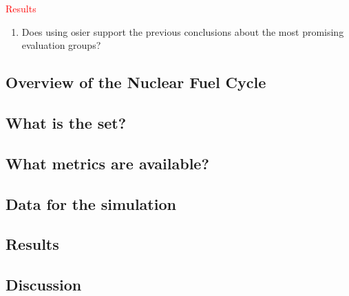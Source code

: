 \textcolor{red}{Results}
\begin{enumerate}
    \item Does using \ac{osier} support the previous conclusions about the most promising evaluation groups?
\end{enumerate}

\subsection{Overview of the Nuclear Fuel Cycle}

\subsection{What is the \ac{set}?}

\subsection{What metrics are available?}

\subsection{Data for the simulation}

\subsection{Results}

\subsection{Discussion}





